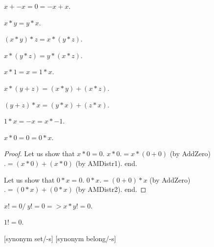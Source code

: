 \documentclass{document}
\begin{document}
\begin{forthel}
    \begin{axiom}[AddInvr]
      $x + -x = 0 = -x + x$.
    \end{axiom}

    \begin{axiom}[MulComm]
      $x * y = y * x$.
    \end{axiom}

    \begin{axiom}[MulAsso]
      $(x * y) * z = x * (y * z)$.
    \end{axiom}

    \begin{axiom}[MulBubble]
      $x * (y * z) = y * (x * z)$.
    \end{axiom}

    \begin{axiom}[MulUnit]
      $x * 1 = x = 1 * x$.
    \end{axiom}

    \begin{axiom}[AMDistr1]
      $x * (y + z) = (x * y) + (x * z)$.
    \end{axiom}

    \begin{axiom}[AMDistr2]
      $(y + z) * x = (y * x) + (z * x)$.
    \end{axiom}

    \begin{axiom}[MulMnOne]
      $1 * x = -x = x * -1$.
    \end{axiom}

    \begin{lemma}[MulZero]
      $x * 0 = 0 = 0 * x$.
    \end{lemma}
    \begin{proof}
      Let us show that $x * 0 = 0$.
        $x * 0 .= x * (0 + 0)$ (by AddZero) $.= (x * 0) + (x * 0)$ (by AMDistr1).
      end.

      Let us show that $0 * x = 0$.
        $0 * x .= (0 + 0) * x$ (by AddZero) $.= (0 * x) + (0 * x)$ (by AMDistr2).
      end.
    \end{proof}

    \begin{axiom}[Cancel]
      $x != 0 /\ y != 0 => x * y != 0$.
    \end{axiom}

    \begin{axiom}[UnNeZr]
      $1 != 0$.
    \end{axiom}

    [synonym set/-s] [synonym belong/-s]


\end{forthel}
\end{document}
